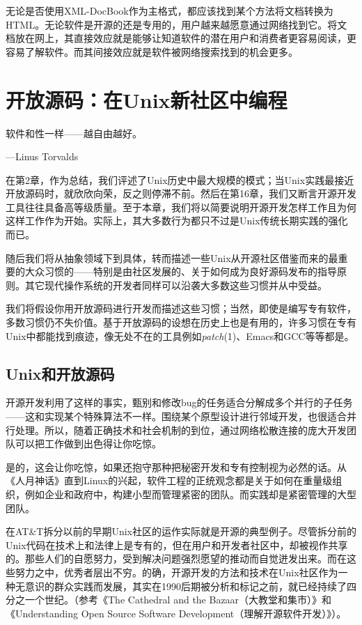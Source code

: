 \documentclass[12pt,oneside]{book}
\begin{document}
无论是否使用XML-DocBook作为主格式，都应该找到某个方法将文档转换为HTML。无论软件是开源的还是专用的，用户越来越愿意通过网络找到它。将文档放在网上，其直接效应就是能够让知道软件的潜在用户和消费者更容易阅读，更容易了解软件。而其间接效应就是软件被网络搜索找到的机会更多。



\chapter{开放源码：在Unix新社区中编程}
\begin{flushright}
 软件和性一样——越自由越好。
 
{\hfill —Linus Torvalds}
\end{flushright}

在第2章，作为总结，我们评述了Unix历史中最大规模的模式；当Unix实践最接近开放源码时，就欣欣向荣，反之则停滞不前。然后在第16章，我们又断言开源开发工具往往具备高等级质量。至于本章，我们将以简要说明开源开发怎样工作且为何这样工作作为开始。实际上，其大多数行为都只不过是Unix传统长期实践的强化而已。

随后我们将从抽象领域下到具体，转而描述一些Unix从开源社区借鉴而来的最重要的大众习惯的——特别是由社区发展的、关于如何成为良好源码发布的指导原则。其它现代操作系统的开发者同样可以沿袭大多数这些习惯并从中受益。

我们将假设你用开放源码进行开发而描述这些习惯；当然，即使是编写专有软件，多数习惯仍不失价值。基于开放源码的设想在历史上也是有用的，许多习惯在专有Unix中都能找到痕迹，像无处不在的工具例如\textit{patch}(1)、Emacs和GCC等等都是。


\section{Unix和开放源码}
开源开发利用了这样的事实，甄别和修改bug的任务适合分解成多个并行的子任务——这和实现某个特殊算法不一样。围绕某个原型设计进行邻域开发，也很适合并行处理。所以，随着正确技术和社会机制的到位，通过网络松散连接的庞大开发团队可以把工作做到出色得让你吃惊。

是的，这会让你吃惊，如果还抱守那种把秘密开发和专有控制视为必然的话。从《人月神话》\cite{Brooks}直到Linux的兴起，软件工程的正统观念都是关于如何在重量级组织，例如企业和政府中，构建小型而管理紧密的团队。而实践却是紧密管理的大型团队。

在AT\&{}T拆分以前的早期Unix社区的运作实际就是开源的典型例子。尽管拆分前的Unix代码在技术上和法律上是专有的，但在用户和开发者社区中，却被视作共享的。那些人们的自愿努力，受到解决问题强烈愿望的推动而自觉迸发出来。而在这些努力之中，优秀者层出不穷。的确，开源开发的方法和技术在Unix社区作为一种无意识的群众实践而发展，其实在1990后期被分析和标记之前，就已经持续了四分之一个世纪。（参考《The Cathedral and the Bazaar（大教堂和集市）》\cite{Raymond01}和《Understanding Open Source Software Development（理解开源软件开发）》\cite{Feller-Fitzgerald}）。
\end{document}
